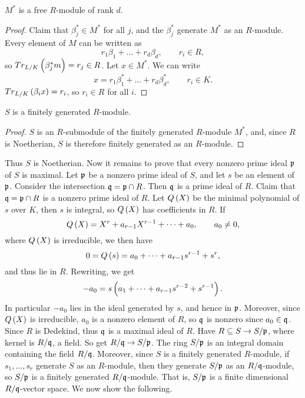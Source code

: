 \begin{corollary}
$ M^* $ is a free $ R $-module of rank $ d $.
\end{corollary}

\begin{proof}
Claim that $ \beta_j^* \in M^* $ for all $ j $, and the $ \beta_j^* $ generate $ M^* $ as an $ R $-module. Every element of $ M $ can be written as
$$ r_1\beta_1 + \dots + r_d\beta_d, \qquad r_i \in R, $$
so $ Tr_{L / K}\br{\beta_j^*m} = r_j \in R $. Let $ x \in M^* $. We can write
$$ x = r_1\beta_1^* + \dots + r_d\beta_d^*, \qquad r_i \in K. $$
$ Tr_{L / K}\br{\beta_ix} = r_i $, so $ r_i \in R $ for all $ i $.
\end{proof}

\pagebreak

\begin{corollary}
$ S $ is a finitely generated $ R $-module.
\end{corollary}

\begin{proof}
$ S $ is an $ R $-submodule of the finitely generated $ R $-module $ M^* $, and, since $ R $ is Noetherian, $ S $ is therefore finitely generated as an $ R $-module.
\end{proof}

Thus $ S $ is Noetherian. Now it remains to prove that every nonzero prime ideal $ \mathfrak{p} $ of $ S $ is maximal. Let $ \mathfrak{p} $ be a nonzero prime ideal of $ S $, and let $ s $ be an element of $ \mathfrak{p} $. Consider the intersection $ \mathfrak{q} = \mathfrak{p} \cap R $. Then $ \mathfrak{q} $ is a prime ideal of $ R $. Claim that $ \mathfrak{q} = \mathfrak{p} \cap R $ is a nonzero prime ideal of $ R $. Let $ Q\br{X} $ be the minimal polynomial of $ s $ over $ K $, then $ s $ is integral, so $ Q\br{X} $ has coefficients in $ R $. If
$$ Q\br{X} = X^r + a_{r - 1}X^{r - 1} + \dots + a_0, \qquad a_0 \ne 0, $$
where $ Q\br{X} $ is irreducible, we then have
$$ 0 = Q\br{s} = a_0 + \dots + a_{r - 1}s^{r - 1} + s^r, $$
and thus lie in $ R $. Rewriting, we get
$$ -a_0 = s\br{a_1 + \dots + a_{r - 1}s^{r - 2} + s^{r - 1}}. $$
In particular $ -a_0 $ lies in the ideal generated by $ s $, and hence in $ \mathfrak{p} $. Moreover, since $ Q\br{X} $ is irreducible, $ a_0 $ is a nonzero element of $ R $, so $ \mathfrak{q} $ is nonzero since $ a_0 \in \mathfrak{q} $. Since $ R $ is Dedekind, thus $ \mathfrak{q} $ is a maximal ideal of $ R $. Have $ R \subseteq S \to S / \mathfrak{p} $, where kernel is $ R / \mathfrak{q} $, a field. So get $ R / \mathfrak{q} \to S / \mathfrak{p} $. The ring $ S / \mathfrak{p} $ is an integral domain containing the field $ R / \mathfrak{q} $. Moreover, since $ S $ is a finitely generated $ R $-module, if $ s_1, \dots, s_r $ generate $ S $ as an $ R $-module, then they generate $ S / \mathfrak{p} $ as an $ R / \mathfrak{q} $-module, so $ S / \mathfrak{p} $ is a finitely generated $ R / \mathfrak{q} $-module. That is, $ S / \mathfrak{p} $ is a finite dimensional $ R / \mathfrak{q} $-vector space. We now show the following.

